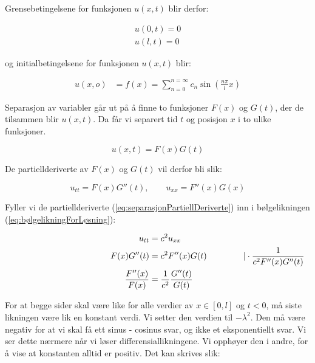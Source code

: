 Grensebetingelsene for funksjonen $u(x,t)$ blir derfor:

\begin{align}
	u(0 , t) = 0 \label{eq:grensebetingelse0}\\
	u(l , t) = 0 \label{eq:grensebetingelsel}
\end{align}

og initialbetingelsene for funksjonen $u(x,t)$ blir:

\begin{align}
	u(x , o) &= f(x) = \sum_{n=0}^{n=\infty} c_n \sin \left( \frac{n \pi}{l} x \right) 	
	\label{eq:initialbetingelse1}
\end{align}

Separasjon av variabler går ut på å finne to funksjoner $F(x)$ og $G(t)$, der de tilsammen blir $u(x , t)$. 
Da får vi separert tid $t$ og posisjon $x$ i to ulike funksjoner.

\begin{equation}
	u(x , t) = F(x)G(t)
	\label{eq:uSeparertPåFOgG}	
\end{equation}

De partiellderiverte av $F(x)$ og $G(t)$ vil derfor bli slik:

\begin{equation}
	u_{tt} = F(x)G''(t), \qquad u_{xx} = F''(x)G(x)
	\label{eq:separasjonPartiellDeriverte}	
\end{equation}

Fyller vi de partiellderiverte (\ref{eq:separasjonPartiellDeriverte}) inn i bølgelikningen (\ref{eq:bølgelikningForLøsning}):

\begin{align*}
  \hspace{35ex}
  u_{tt} &= c^2 u_{xx} \\
  \hspace{2ex} F(x)G''(t) &= c^2 F''(x)G(t) \hspace{10ex} \vert 
  \cdot \frac{1}{c^2 F''(x) G''(t)} \\
  \frac{F''(x)}{F(x)} &= \frac{1}{c^2} \frac{G''(t)}{G(t)}
\end{align*}

For at begge sider skal være like for alle verdier av $x \in \left[ 0 , l \right]$ og $t < 0$, må siste 
likningen være lik en konstant verdi. Vi setter den verdien til $- \lambda^2$. Den må være negativ for 
at vi skal få ett sinus - cosinus svar, og ikke et eksponentiellt svar. Vi ser dette nærmere når vi løser
differensiallikningene. Vi opphøyer den i andre, for å vise at konstanten alltid er positiv.
Det kan skrives slik:


